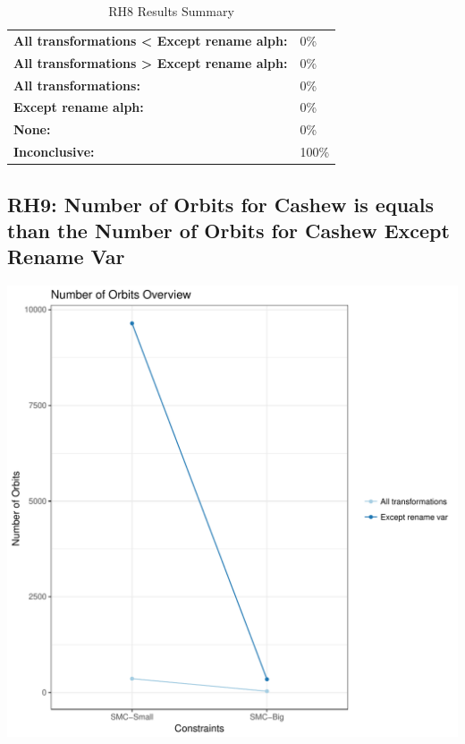 \documentclass{article}\usepackage[]{graphicx}\usepackage[]{color}
\makeatletter
\def\maxwidth{ %
  \ifdim\Gin@nat@width>\linewidth
    \linewidth
  \else
    \Gin@nat@width
  \fi
}
\newenvironment{knitrout}{}{} %
\makeatother
\begin{document}
	\begin{table}[H]
	\centering
	\caption{RH8 Results Summary}
	\begin{tabular}{ll}
	\textbf{All transformations \textless{} Except rename alph:}& 0\% \\
	\textbf{All transformations \textgreater{} Except rename alph:}& 0\%\\
	\textbf{All transformations:} & 0\%\\
	\textbf{Except rename alph:} & 0\%\\
	\textbf{None:}& 0\%\\
	\textbf{Inconclusive:}& 100\%
			
	
	\end{tabular}
	\end{table}
	
	
	



\subsection{RH9: Number of Orbits for Cashew is equals than the Number of Orbits for Cashew Except Rename Var}


 
\begin{knitrout}
\color{fgcolor}
\includegraphics[width=\maxwidth]{figure/overview_RH9-1} 

\end{knitrout}
 	
\end{document}
